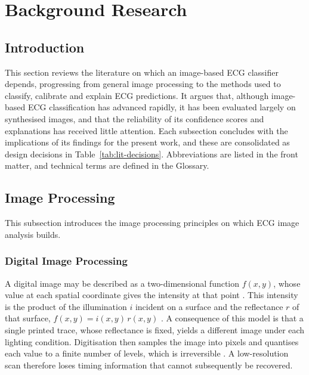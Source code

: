 \documentclass[12pt,nonacm,acmlarge,titlepage,screen]{acmart}
\begin{document}
\section{Background Research} %
\label{ch:lit}
\subsection{Introduction}

This section reviews the literature on which an image-based ECG classifier depends, progressing from general image processing to the methods used to classify, calibrate and explain ECG predictions. It argues that, although image-based ECG classification has advanced rapidly, it has been evaluated largely on synthesised images, and that the reliability of its confidence scores and explanations has received little attention. Each subsection concludes with the implications of its findings for the present work, and these are consolidated as design decisions in Table~\ref{tab:lit-decisions}. Abbreviations are listed in the front matter, and technical terms are defined in the Glossary.

\subsection{Image Processing}
\label{sec:img-proc-group}

This subsection introduces the image processing principles on which ECG image analysis builds.

\subsubsection{Digital Image Processing}
\label{sec:image-processing}

A digital image may be described as a two-dimensional function $f(x,y)$, whose value at each spatial coordinate gives the intensity at that point \cite{gonzalez_digital_2018}. This intensity is the product of the illumination $i$ incident on a surface and the reflectance $r$ of that surface, $f(x,y) = i(x,y)\,r(x,y)$ \cite{stockham_image_1972}. A consequence of this model is that a single printed trace, whose reflectance is fixed, yields a different image under each lighting condition. Digitisation then samples the image into pixels and quantises each value to a finite number of levels, which is irreversible \cite{gonzalez_digital_2018}. A low-resolution scan therefore loses timing information that cannot subsequently be recovered.
\end{document}
